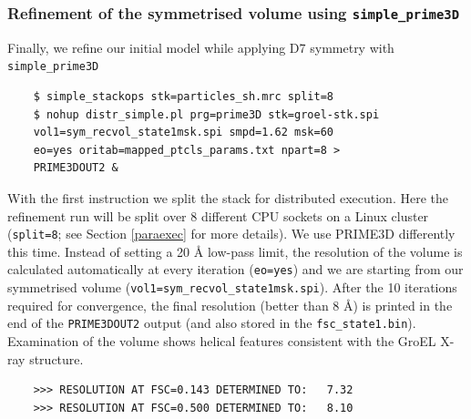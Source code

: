 \documentclass[a4paper,11pt]{article}
\newcommand{\prgname}[1]{\textcolor{NavyBlue}{\texttt{#1}}}
\begin{document}
\subsubsection{Refinement of the symmetrised volume using \prgname{simple\_prime3D}}

Finally, we refine our initial model while applying D7 symmetry with  \prgname{simple\_prime3D}
\begin{verbatim}
    $ simple_stackops stk=particles_sh.mrc split=8
    $ nohup distr_simple.pl prg=prime3D stk=groel-stk.spi
    vol1=sym_recvol_state1msk.spi smpd=1.62 msk=60 
    eo=yes oritab=mapped_ptcls_params.txt npart=8 > 
    PRIME3DOUT2 &
\end{verbatim}
With the first instruction we split the stack for distributed execution. Here the refinement run will be split over 8 different CPU sockets on a Linux cluster (\texttt{split=8}; see Section \ref{paraexec} for more details). We use PRIME3D differently this time. Instead of setting a 20 \AA{} low-pass limit, the resolution of the volume is calculated automatically at every iteration (\texttt{eo=yes}) and we are starting from our symmetrised volume (\texttt{vol1=sym\_recvol\_state1msk.spi}). After the 10 iterations required for convergence, the final resolution  (better than 8 \AA{}) is printed in the end of the \texttt{PRIME3DOUT2} output (and also stored in the \texttt{fsc\_state1.bin}). Examination of the volume shows helical features consistent with the GroEL X-ray structure.
\begin{verbatim}
    >>> RESOLUTION AT FSC=0.143 DETERMINED TO:   7.32
    >>> RESOLUTION AT FSC=0.500 DETERMINED TO:   8.10
\end{verbatim}
\end{document}

